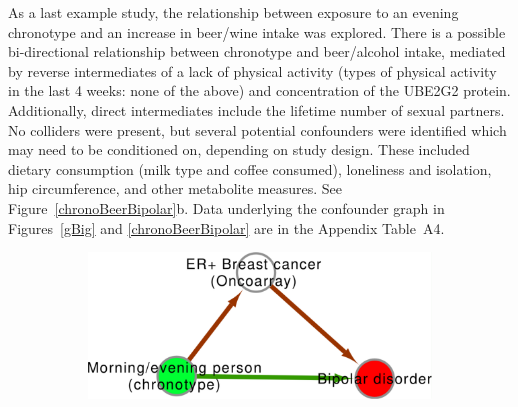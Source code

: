 \documentclass[genes,article,accept,moreauthors,pdftex]{Definitions/mdpi}
\begin{document}
\begin{paracol}{2}
\switchcolumn






As a last example study, the relationship between exposure to an evening chronotype and an increase in beer/wine intake was explored. There is a possible bi-directional relationship between chronotype and beer/alcohol intake, mediated by reverse intermediates of a lack of physical activity (types of physical activity in the last 4 weeks: none of the above) and concentration of the UBE2G2 protein. Additionally, direct intermediates include the lifetime number of sexual partners. No colliders were present, but several potential confounders were identified which may need to be conditioned on, depending on study design. These included dietary consumption (milk type and coffee consumed), loneliness and isolation, hip circumference, and other metabolite measures. See Figure~\ref{chronoBeerBipolar}b. Data underlying the confounder graph in Figures~\ref{gBig} and \ref{chronoBeerBipolar} are in the Appendix{ \mbox{Table A4}}.
\begin{figure}[H]
{\captionsetup{position=bottom,justification=centering}
\begin{subfigure}{.35\linewidth}
	\includegraphics[width=\linewidth]{Figs/Analysis3/new_chrono_bipolar.pdf}
\caption{}
\label{chronoBipolar}
\end{subfigure}
\begin{subfigure}{.65\linewidth}

\end{subfigure}}
\end{figure}
\end{paracol}
\end{document}
